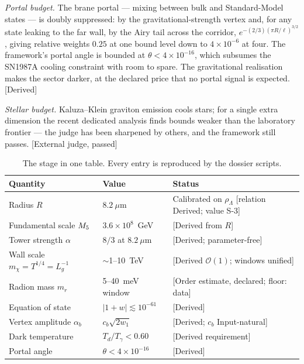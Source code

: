 \emph{Portal budget.} The brane portal --- mixing between bulk and Standard-Model states --- is doubly suppressed: by the gravitational-strength vertex and, for any state leaking to the far wall, by the Airy tail across the corridor, $e^{-(2/3)(\pi R/\ell)^{3/2}}$, giving relative weights $0.25$ at one bound level down to $4\times10^{-6}$ at four. The framework's portal angle is bounded at $\theta<4\times10^{-16}$, which subsumes the SN1987A cooling constraint with room to spare. The gravitational realisation makes the sector darker, at the declared price that no portal signal is expected. [Derived]

\emph{Stellar budget.} Kaluza--Klein graviton emission cools stars; for a single extra dimension the recent dedicated analysis \cite{Hardy} finds bounds weaker than the laboratory frontier --- the judge has been sharpened by others, and the framework still passes. [External judge, passed]

\begin{table}[h]
\centering\small
\begin{tabular}{lll}
\toprule
\textbf{Quantity} & \textbf{Value} & \textbf{Status}\\
\midrule
Radius $R$ & $8.2~\mu$m & Calibrated on $\rho_{\Lambda}$ [relation Derived; value S-3]\\
Fundamental scale $M_5$ & $3.6\times10^{8}$~GeV & [Derived from $R$]\\
Tower strength $\alpha$ & $8/3$ at $8.2~\mu$m & [Derived; parameter-free]\\
Wall scale $m_\chi=T^{1/4}=L_{g}^{-1}$ & $\sim$1--10~TeV & [Derived $\mathcal{O}(1)$; windows unified]\\
Radion mass $m_{r}$ & 5--40~meV window & [Order estimate, declared; floor: data]\\
Equation of state & $|1+w|\lesssim10^{-61}$ & [Derived]\\
Vertex amplitude $\alpha_{b}$ & $c_{b}\sqrt{2w_{1}}$ & [Derived; $c_{b}$ Input-natural]\\
Dark temperature & $T_{d}/T_{\gamma}<0.60$ & [Derived requirement]\\
Portal angle & $\theta<4\times10^{-16}$ & [Derived]\\
\bottomrule
\end{tabular}
\caption{The stage in one table. Every entry is reproduced by the dossier scripts.}
\end{table}

